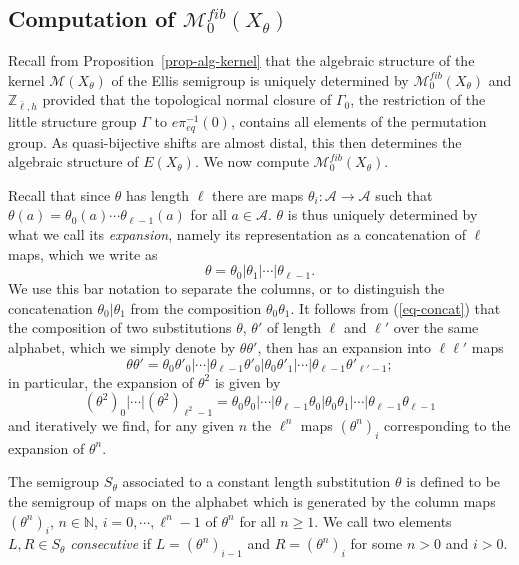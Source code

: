 \documentclass[10pt,a4paper]{amsart}
\numberwithin{equation}{section}
\newcommand{\Z}{\mathbb Z}
\newcommand{\N}{\mathbb N}
\newcommand{\Aa}{{\mathcal A}}
\newcommand{\pe}{\pi_{eq}}
\newcommand{\M}{\mathcal M}
\begin{document}
\subsection{Computation of $\M^{fib}_0(X_\theta)$}\label{structural-section} 
Recall from Proposition~\ref{prop-alg-kernel} that the algebraic structure of the kernel $\M(X_\theta)$ of the Ellis semigroup is uniquely determined by  $\M_0^{fib}(X_\theta)$ and 
$\Z_{\bar{\ell},h}$ provided that the topological normal closure of $\Gamma_0$,  the restriction of the little structure group $\Gamma$ to $e\pe^{-1}(0)$, contains all elements of the permutation group. As quasi-bijective shifts are almost distal, this then determines the algebraic structure of $E(X_\theta)$. We now compute $\M^{fib}_0(X_\theta)$.

Recall that since $\theta$ has length $\ell$ there are maps  $\theta_i:\mathcal A \rightarrow \mathcal A$ such that
$
\theta(a) = \theta_0(a)\cdots \theta_{\ell-1}(a)
$
for all $a\in\Aa$.
$\theta$ is thus uniquely determined by what we call its {\em expansion}, namely its representation as a concatenation of $\ell$ maps, which we write as
$$\theta = \theta_0|\theta_1|\cdots |\theta_{\ell-1}.$$
We use this bar notation to separate the columns, or  to distinguish the concatenation $ \theta_0|\theta_1$  from the composition $ \theta_0\theta_1$.
It follows from (\ref{eq-concat}) that 
the composition of two substitutions $\theta$, $\theta'$ of length $\ell$ and $\ell'$ over the same alphabet, which we simply denote by $\theta \theta'$, then has  an expansion into
$\ell \ell'$ maps
\begin{equation}\nonumber
\theta \theta' = \theta_0\theta'_0 |\cdots |\theta_{\ell-1}\theta'_0|\theta_0\theta'_1| \cdots |
\theta_{\ell-1}\theta'_{\ell'-1}; 
\end{equation}
in particular, the expansion of $\theta^2$ is given by 
\begin{equation}\label{expansion}
(\theta^2)_0|\cdots |(\theta^2)_{\ell^2-1} = \theta_0\theta_0 | \cdots |\theta_{\ell - 1}\theta_{0}|  \theta_0\theta_1 |  \cdots |\theta_{\ell-1}\theta_{\ell-1} 
\end{equation}
and iteratively we find, for any given $n$ the $\ell^n$ maps $(\theta^n)_i$ corresponding to the expansion of $\theta^n$. 




The semigroup $S_\theta$ associated to a constant length substitution $\theta$ is defined to be the semigroup of maps on the alphabet which is generated by the column maps $(\theta^n)_i$, $n\in\N$, $i=0,\cdots,\ell^n-1$ of $\theta^n$ for all $n\geq 1$. We call two elements $L,R\in S_\theta$ \emph{consecutive} if $L=(\theta^n)_{i-1}$ and $R=(\theta^n)_i$ for some $n>0$ and $i>0$.
\end{document}
